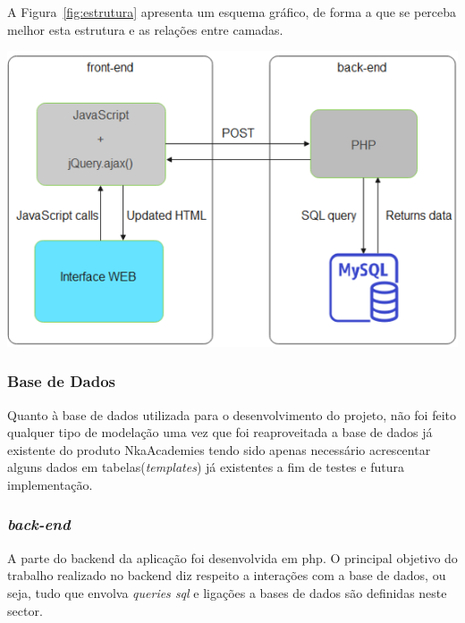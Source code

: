 A Figura~\ref{fig:estrutura} apresenta um esquema gráfico, de forma a que se perceba melhor esta estrutura e as relações entre camadas.

\begin{center}
        \includegraphics[width=\textwidth,height=\textheight,keepaspectratio]{images/estrutura.png}
        \label{fig:estrutura}
\end{center}

\subsubsection{Base de Dados}

Quanto à base de dados utilizada para o desenvolvimento do projeto, não foi feito qualquer tipo de modelação uma vez que foi reaproveitada a base de dados já existente do produto NkaAcademies tendo sido apenas necessário acrescentar alguns dados em tabelas(\textit{templates}) já existentes a fim de testes e futura implementação.


\subsubsection{\textit{back-end}}

A parte do \gls{backend} da aplicação foi desenvolvida em \acrshort{php}. O principal objetivo do trabalho realizado no \gls{backend} diz respeito a interações com a base de dados, ou seja, tudo que envolva \textit{queries \acrshort{sql}} e ligações a bases de dados são definidas neste sector.

